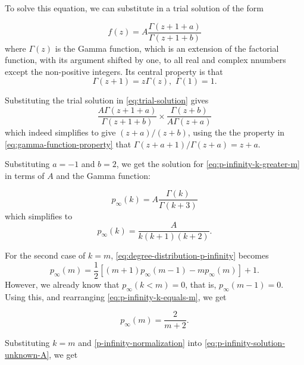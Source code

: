 To solve this equation, we can substitute in a trial solution of the form

\begin{equation}
	f(z) = A \frac{\Gamma(z+1+a)}{\Gamma(z+1+b)}
	\label{eq:trial-solution}
\end{equation}
where $\Gamma(z)$ is the Gamma function, which is an extension of the factorial function, with its argument shifted by one, to all real and complex nnumbers except the non-positive integers. Its central property is that
\begin{equation}
	\Gamma(z+1) = z \Gamma(z),\,\, \Gamma(1) = 1.
	\label{eq:gamma-function-property}
\end{equation}

Substituting the trial solution in \autoref{eq:trial-solution} gives
\begin{equation}
	\frac{A \Gamma(z+1+a)}{\Gamma(z+1+b)} \times \frac{\Gamma(z+b)}{A \Gamma(z+a)}
\end{equation}
which indeed simplifies to give $(z+a) / (z+b)$, using the the property in \autoref{eq:gamma-function-property} that $\Gamma(z+a+1) / \Gamma(z+a) = z+a$. 

Substituting $a = -1$ and $b=2$, we get the solution for \autoref{eq:p-infinity-k-greater-m} in terms of $A$ and the Gamma function:

\begin{equation}
	p_{\infty}(k) = A \frac{\Gamma(k)}{\Gamma(k+3)}
\end{equation}
which simplifies to 
\begin{equation}
	p_{\infty}(k) = \frac{A}{k(k+1)(k+2)}.
	\label{eq:p-infinity-solution-unknown-A}
\end{equation}

For the second case of $k = m$, \autoref{eq:degree-distribution-p-infinity} becomes 
\begin{equation}
	p_{\infty}(m) = \frac{1}{2}[(m+1)p_{\infty}(m-1) - mp_{\infty}(m)] + 1. 
	\label{eq:p-infinity-k-equals-m}
\end{equation}
However, we already know that $p_{\infty}(k < m) = 0$, that is, $p_{\infty}(m-1) = 0$. Using this, and rearranging \autoref{eq:p-infinity-k-equals-m}, we get 

\begin{equation}
	p_{\infty}(m) = \frac{2}{m+2}.
	\label{p-infinity-normalization}
\end{equation}

Substituting $k = m$ and \autoref{p-infinity-normalization} into \autoref{eq:p-infinity-solution-unknown-A}, we get 

